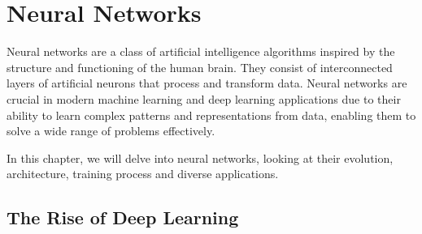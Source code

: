 % 

% 
 
\section{Neural Networks}


Neural networks are a class of artificial intelligence algorithms inspired by the structure and functioning of the human brain. They consist of interconnected layers of artificial neurons that process and transform data. Neural networks are crucial in modern machine learning and deep learning applications due to their ability to learn complex patterns and representations from data, enabling them to solve a wide range of problems effectively.

In this chapter, we will delve into neural networks, looking at their evolution, architecture, training process and diverse applications.
% 

\subsection{The Rise of Deep Learning}


